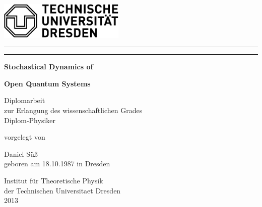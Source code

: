 \thispagestyle{empty}
\vspace{-5em}
\begin{flushleft}
  \includegraphics[angle=0,width=60mm]{TU_Logo_SW.pdf}
  \par
\end{flushleft}
\vspace{-3em}
\begin{center}\rule{\textwidth}{0.1ex}\par\end{center}
\vspace{-4em}
\begin{center}\rule{\textwidth}{0.1ex}\par\end{center}

\vfill
\begin{center}\textbf{\Huge Stochastical Dynamics of}\par\end{center}
\begin{center}\textbf{\Huge Open Quantum Systems}\par\end{center}
\vfill
\begin{center}
{\large Diplomarbeit}\\
{\large zur Erlangung des wissenschaftlichen Grades}\\
{\large Diplom-Physiker}\par
\end{center}

\begin{center}vorgelegt von\par\end{center}
\begin{center}{\large Daniel Süß}\\geboren am 18.10.1987 in
Dresden\par
\end{center}
\vspace{13mm}
\begin{center}
{\large Institut für Theoretische Physik}\\
{\large der Technischen Universitaet Dresden}\\
{\large 2013}\par
\end{center}

